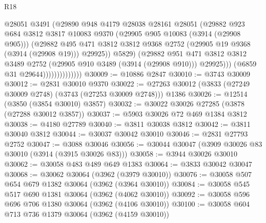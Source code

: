 \begin{lexlean}{R18}
\begin{coremodule}
                                  @28051
                                  @3491
                                  (@29890
                                    @948
                                    @4179
                                    @28038
                                    @28161
                                    @28051
                                    (@29882
                                      @923
                                      @684
                                      @3812
                                      @3817
                                      @10083
                                      @9370
                                      (@29905 @905 @10083 (@3914 (@29908 @905)))
                                      (@29882
                                        @495
                                        @471
                                        @3812
                                        @3812
                                        @9368
                                        @2752
                                        (@29905 @19 @9368 (@3914 (@29908 @19)))
                                        @29925))
                                    @5829)
                                  (@29882
                                    @951
                                    @471
                                    @3812
                                    @3812
                                    @3489
                                    @2752
                                    (@29905 @910 @3489 (@3914 (@29908 @910)))
                                    @29925)))
                              (@6859 @31 @29644))))))))))))))
@30009 := @10886 @2847
@30010 := @3743 @30009
@30012 := @2831 @30010 @9370
@30022 := @27263 @30012 (@3833 (@27249 @30009 @2748) (@3743 (@27253 @30009 @2748))) @1386
@30026 := @12514 (@3850 (@3854 @30010) @3857)
@30032 := @30022 @30026 @27285 (@3878 (@27288 @30012 @3857))
@30037 := @5903 @30026 @72 @469 @1384 @3812
@30038 := @4180 @27789
@30040 := @3811 @30038 @3812
@30042 := @3811 @30040 @3812
@30044 := @30037 @30042 @30010
@30046 := @2831 @27793 @2752
@30047 := @3088 @30046
@30056 := @30044 @30047 (@3909 @30026 @83 @30010 (@3914 (@3915 @30026 @83)))
@30058 := @3944 @30026 @30010
@30062 := @30058 @483 @489 @649 @1383
@30064 := @3833 @30042 @30047
@30068 := @30062 @30064 (@3962 (@3979 @30010))
@30076 := @30058 @507 @654 @679 @1382 @30064 (@3962 (@3964 @30010))
@30084 := @30058 @545 @517 @690 @1381 @30064 (@3962 (@4062 @30010))
@30092 := @30058 @596 @696 @706 @1380 @30064 (@3962 (@4106 @30010))
@30100 := @30058 @604 @713 @736 @1379 @30064 (@3962 (@4159 @30010))

\end{coremodule}
\end{lexlean}
